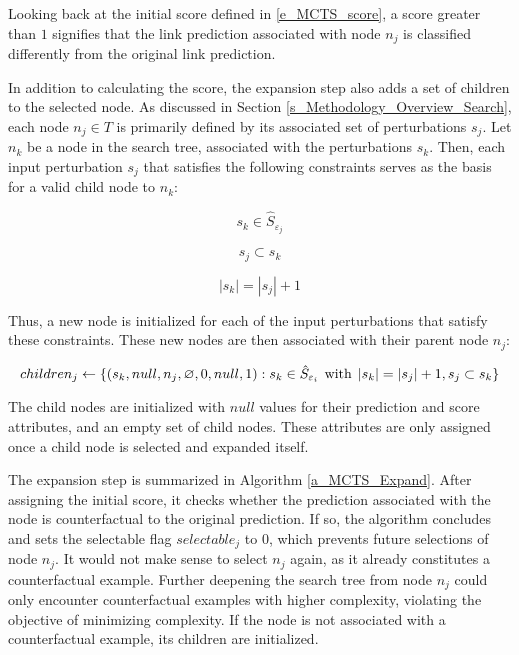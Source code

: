 Looking back at the initial score defined in \ref{e_MCTS_score}, a score greater than $1$ signifies that the link prediction associated with node $n_j$ is classified differently from the original link prediction.

In addition to calculating the score, the expansion step also adds a set of children to the selected node. As discussed in Section \ref{s_Methodology_Overview_Search}, each node $n_j \in T$ is primarily defined by its associated set of perturbations $s_j$. Let $n_k$ be a node in the search tree, associated with the perturbations $s_k$. Then, each input perturbation $s_j$ that satisfies the following constraints serves as the basis for a valid child node to $n_k$:

\begin{equation}
    s_k \in \hat{S}_{\varepsilon_j}
\end{equation}

\begin{equation}
    s_j \subset s_k
\end{equation}

\begin{equation}
    |s_k| = |s_j| + 1
\end{equation}

Thus, a new node is initialized for each of the input perturbations that satisfy these constraints. These new nodes are then associated with their parent node $n_j$:


\begin{equation}
    children_j \gets \{(s_k, null, n_j, \varnothing, 0, null, 1): s_k \in \hat{S}_{\varepsilon_i} \hspace{1.5mm} \mathrm{with} \hspace{1.5mm} |s_k| = |s_j| + 1, s_j \subset s_k\}
\end{equation}

The child nodes are initialized with $null$ values for their prediction and score attributes, and an empty set of child nodes. These attributes are only assigned once a child node is selected and expanded itself.

The expansion step is summarized in Algorithm \ref{a_MCTS_Expand}. After assigning the initial score, it checks whether the prediction associated with the node is counterfactual to the original prediction. If so, the algorithm concludes and sets the selectable flag $selectable_j$ to $0$, which prevents future selections of node $n_j$. It would not make sense to select $n_j$ again, as it already constitutes a counterfactual example. Further deepening the search tree from node $n_j$ could only encounter counterfactual examples with higher complexity, violating the objective of minimizing complexity. If the node is not associated with a counterfactual example, its children are initialized.

